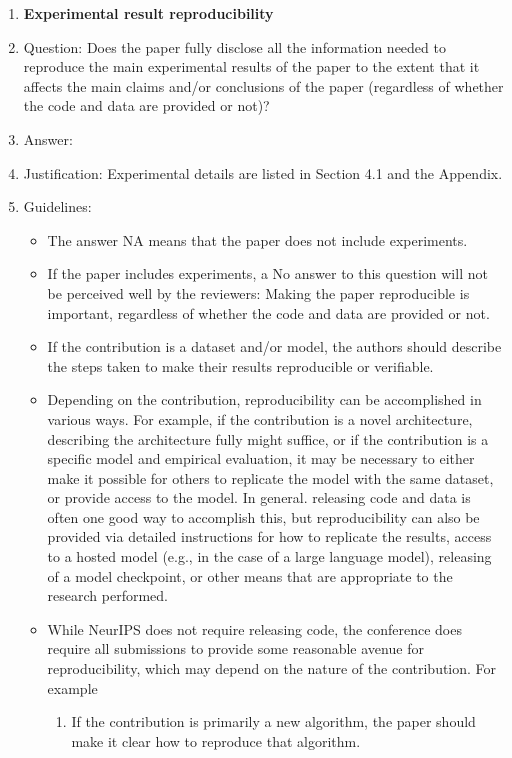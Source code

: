 \documentclass{article}
\begin{document}
\begin{enumerate}
    \item {\bf Experimental result reproducibility}
    \item[] Question: Does the paper fully disclose all the information needed to reproduce the main experimental results of the paper to the extent that it affects the main claims and/or conclusions of the paper (regardless of whether the code and data are provided or not)?
    \item[] Answer: \answerYes{} %
    \item[] Justification: Experimental details are listed in Section 4.1 and the Appendix.
    \item[] Guidelines:
    \begin{itemize}
        \item The answer NA means that the paper does not include experiments.
        \item If the paper includes experiments, a No answer to this question will not be perceived well by the reviewers: Making the paper reproducible is important, regardless of whether the code and data are provided or not.
        \item If the contribution is a dataset and/or model, the authors should describe the steps taken to make their results reproducible or verifiable. 
        \item Depending on the contribution, reproducibility can be accomplished in various ways. For example, if the contribution is a novel architecture, describing the architecture fully might suffice, or if the contribution is a specific model and empirical evaluation, it may be necessary to either make it possible for others to replicate the model with the same dataset, or provide access to the model. In general. releasing code and data is often one good way to accomplish this, but reproducibility can also be provided via detailed instructions for how to replicate the results, access to a hosted model (e.g., in the case of a large language model), releasing of a model checkpoint, or other means that are appropriate to the research performed.
        \item While NeurIPS does not require releasing code, the conference does require all submissions to provide some reasonable avenue for reproducibility, which may depend on the nature of the contribution. For example
        \begin{enumerate}
            \item If the contribution is primarily a new algorithm, the paper should make it clear how to reproduce that algorithm.

\end{enumerate}
\end{itemize}
\end{enumerate}
\end{document}

